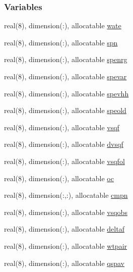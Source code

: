 \subsubsection*{Variables}
\begin{DoxyCompactItemize}
\item 
real(8), dimension(\+:), allocatable \hyperlink{namespacelevels_aeb60866d99b0237db54cd7bb0d04eb81}{wate}
\item 
real(8), dimension(\+:), allocatable \hyperlink{namespacelevels_a86fa1ec0b32aa8e96038b6ce7591d586}{spn}
\item 
real(8), dimension(\+:), allocatable \hyperlink{namespacelevels_aa8277bbd2042d8f92caeace6331d01d4}{spenrg}
\item 
real(8), dimension(\+:), allocatable \hyperlink{namespacelevels_ad173ad37dacc33126c033bd445f91784}{spevar}
\item 
real(8), dimension(\+:), allocatable \hyperlink{namespacelevels_acc8c684273be2d8e414d8220a6e83d59}{spevhh}
\item 
real(8), dimension(\+:), allocatable \hyperlink{namespacelevels_ac7f33a0c4c0ea6de1a91e776c8f9ce61}{speold}
\item 
real(8), dimension(\+:), allocatable \hyperlink{namespacelevels_a99f8fedba7473412f8f1bc3cbc607cd0}{vsqf}
\item 
real(8), dimension(\+:), allocatable \hyperlink{namespacelevels_a87fd2946b844fdbb5edd84ea122a7c14}{dvsqf}
\item 
real(8), dimension(\+:), allocatable \hyperlink{namespacelevels_aef67aed951be3f696e628e652092e968}{vsqfol}
\item 
real(8), dimension(\+:), allocatable \hyperlink{namespacelevels_a9f3b4e034b5daae6cfb8bda259926b32}{oc}
\item 
real(8), dimension(\+:,\+:), allocatable \hyperlink{namespacelevels_ac517c8629a25b882f0a7b366e6426eec}{cmpn}
\item 
real(8), dimension(\+:), allocatable \hyperlink{namespacelevels_abac62079bff1cfcbd28b41bf5f080083}{vsqobs}
\item 
real(8), dimension(\+:), allocatable \hyperlink{namespacelevels_a948be7b0b8534179acced4d11ecf0f8c}{deltaf}
\item 
real(8), dimension(\+:), allocatable \hyperlink{namespacelevels_a9e4827753c29903f6526f3426d768585}{wtpair}
\item 
real(8), dimension(\+:), allocatable \hyperlink{namespacelevels_aa793d2f1b6ed97cd9c5399e4c1928337}{qspav}
\item 

\end{DoxyCompactItemize}
